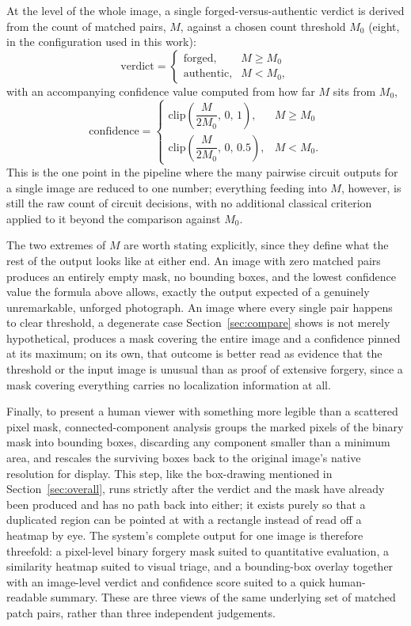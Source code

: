 \documentclass[conference]{IEEEtran}
\begin{document}
At the level of the whole image, a single forged-versus-authentic verdict is derived from the count of matched pairs, $M$, against a chosen count threshold $M_0$ (eight, in the configuration used in this work):
\begin{equation}
\text{verdict} =
\begin{cases}
\text{forged}, & M \ge M_0\\
\text{authentic}, & M < M_0,
\end{cases}
\label{eq:verdict}
\end{equation}
with an accompanying confidence value computed from how far $M$ sits from $M_0$,
\begin{equation}
\text{confidence} =
\begin{cases}
\mathrm{clip}\!\left(\dfrac{M}{2M_0},\, 0,\, 1\right), & M \ge M_0\\[2ex]
\mathrm{clip}\!\left(\dfrac{M}{2M_0},\, 0,\, 0.5\right), & M < M_0.
\end{cases}
\label{eq:conf}
\end{equation}
This is the one point in the pipeline where the many pairwise circuit outputs for a single image are reduced to one number; everything feeding into $M$, however, is still the raw count of circuit decisions, with no additional classical criterion applied to it beyond the comparison against $M_0$.

The two extremes of $M$ are worth stating explicitly, since they define what the rest of the output looks like at either end. An image with zero matched pairs produces an entirely empty mask, no bounding boxes, and the lowest confidence value the formula above allows, exactly the output expected of a genuinely unremarkable, unforged photograph. An image where every single pair happens to clear threshold, a degenerate case Section~\ref{sec:compare} shows is not merely hypothetical, produces a mask covering the entire image and a confidence pinned at its maximum; on its own, that outcome is better read as evidence that the threshold or the input image is unusual than as proof of extensive forgery, since a mask covering everything carries no localization information at all.

Finally, to present a human viewer with something more legible than a scattered pixel mask, connected-component analysis groups the marked pixels of the binary mask into bounding boxes, discarding any component smaller than a minimum area, and rescales the surviving boxes back to the original image's native resolution for display. This step, like the box-drawing mentioned in Section~\ref{sec:overall}, runs strictly after the verdict and the mask have already been produced and has no path back into either; it exists purely so that a duplicated region can be pointed at with a rectangle instead of read off a heatmap by eye. The system's complete output for one image is therefore threefold: a pixel-level binary forgery mask suited to quantitative evaluation, a similarity heatmap suited to visual triage, and a bounding-box overlay together with an image-level verdict and confidence score suited to a quick human-readable summary. These are three views of the same underlying set of matched patch pairs, rather than three independent judgements.
\end{document}
